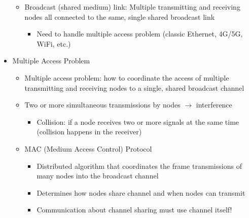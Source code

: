 \begin{itemize}
\begin{itemize}
      \item Broadcast (shared medium) link: Multiple transmitting and receiving nodes all connected to the same, single shared broadcast link

        \begin{itemize}

          \item Need to handle multiple access problem (classic Ethernet, 4G/5G, WiFi, etc.)

        \end{itemize}

    \end{itemize}

  \item Multiple Access Problem

    \begin{itemize}

      \item Multiple access problem: how to coordinate the access of multiple transmitting and receiving nodes to a single, shared broadcast channel

      \item Two or more simultaneous transmissions by nodes $\to$ interference

        \begin{itemize}

          \item Collision: if a node receives two or more signals at the same time (collision happens in the receiver)

        \end{itemize}

      \item MAC (Medium Access Control) Protocol

        \begin{itemize}

          \item Distributed algorithm that coordinates the frame transmissions of many nodes into the broadcast channel

          \item Determines how nodes share channel and when nodes can transmit

        \end{itemize}

        \begin{itemize}

          \item Communication about channel sharing must use channel itself! 


\end{itemize}
\end{itemize}
\end{itemize}
